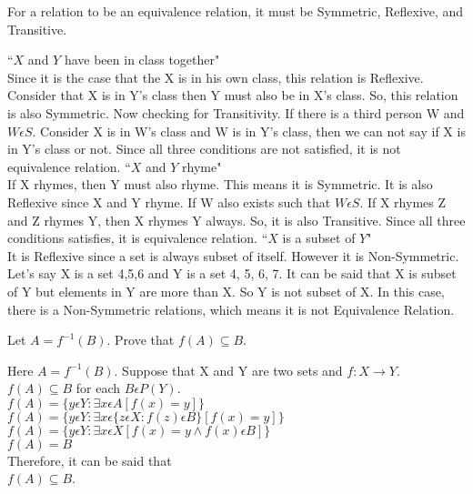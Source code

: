 \documentclass[addpoints]{exam}
\begin{document}
\begin{questions}
\begin{parts}
  \begin{solution}
    For a relation to be an equivalence relation, it must be Symmetric, Reflexive, and Transitive. 
    \begin{subparts}
    \subpart ``$X$ and $Y$ have been in class together" \\
    Since it is the case that the X is in his own class, this relation is Reflexive. Consider that X is in Y's class then Y must also be in X's class. So, this relation is also Symmetric. Now checking for Transitivity. If there is a third person W and  $W \epsilon S$. Consider X is in W's class and W is in Y's class, then we can not say if X is in Y's class or not. Since all three conditions are not satisfied, it is not equivalence relation. 
    \subpart ``$X$ and $Y$ rhyme" \\
    If X rhymes, then Y must also rhyme. This means it is Symmetric. It is also Reflexive since X and Y rhyme. If W also exists such that $W \epsilon S$. If X rhymes Z and Z rhymes Y, then X rhymes Y always. So, it is also Transitive. Since all three conditions satisfies, it is equivalence relation.  
    \subpart ``$X$ is a subset of $Y$" \\
    It is Reflexive since a set is always subset of itself. However it is Non-Symmetric. Let's say X is a set {4,5,6} and Y is a set {4, 5, 6, 7}. It can be said that X is subset of Y but elements in Y are more than X. So Y is not subset of X. In this case, there is a Non-Symmetric relations, which means it is not Equivalence Relation.
  \end{subparts}
  \end{solution}

\end{parts}

\question[15] Let $A = f^{-1}(B)$. Prove that $f(A) \subseteq B$.
  \begin{solution}
    Here $A = f^{-1}(B)$. Suppose that X and Y are two sets and $f: X \rightarrow Y$. $f(A) \subseteq B$ for each $B \epsilon P(Y)$. \\
    $f(A) = \{y \epsilon Y : \exists x \epsilon A [f(x) =y] \}$ \\
    $f(A) = \{ y \epsilon Y : \exists x \epsilon \{ z \epsilon X : f(z) \epsilon B \} [f(x) = y] \} $\\
    $f(A) = \{ y \epsilon Y : \exists x \epsilon X [f(x) = y \wedge f(x) \epsilon B ] \} $ \\
    $f(A) = B $\\
    Therefore, it can be said that \\
      $f(A) \subseteq B$.
    

\end{solution}
\end{questions}
\end{document}
